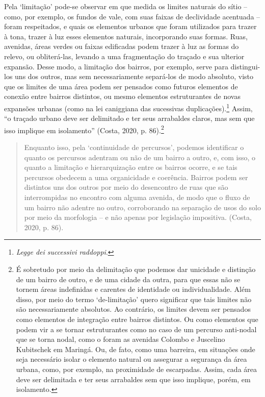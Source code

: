 \documentclass[12pt, a4paper]{book} %
\begin{document}
        Pela `limitação' pode-se observar em que medida os limites naturais do sítio – como, por exemplo, os fundos de vale, com suas faixas de declividade acentuada – foram respeitados, e quais os elementos urbanos que foram utilizados para trazer à tona, trazer à luz esses elementos naturais, incorporando suas formas. Ruas, avenidas, áreas verdes ou faixas edificadas podem trazer à luz as formas do relevo, ou obliterá-las, levando a uma fragmentação do traçado e sua ulterior expansão. Desse modo, a limitação dos bairros, por exemplo, serve para distingui-los uns dos outros, mas sem necessariamente separá-los de modo absoluto, visto que os limites de uma área podem ser pensados como futuros elementos de conexão entre bairros distintos, ou mesmo elementos estruturantes de novas expansões urbanas (como na lei caniggiana das sucessivas duplicações).\footnote[0]{\textit{Legge dei successivi raddoppi}.} Assim, ``o traçado urbano deve ser delimitado e ter seus arrabaldes claros, mas sem que isso implique em isolamento'' (Costa, 2020, p. 86).\footnote[26]{É sobretudo por meio da delimitação que podemos dar unicidade e distinção de um bairro de outro, e de uma cidade da outra, para que essas não se tornem áreas indefinidas e carentes de identidade ou individualidade. Além disso, por meio do termo ‘de-limitação’ quero significar que tais limites não são necessariamente absolutos. Ao contrário, os limites devem ser pensados como elementos de integração entre bairros distintos. Ou como elementos que podem vir a se tornar estruturantes como no caso de um percurso anti-nodal que se torna nodal, como o foram as avenidas Colombo e Juscelino Kubitschek em Maringá. Ou, de fato, como uma barreira, em situações onde seja necessário isolar o elemento natural ou assegurar a segurança da área urbana, como, por exemplo, na proximidade de escarpadas. Assim, cada área deve ser delimitada e ter seus arrabaldes sem que isso implique, porém, em isolamento.}

        \begin{quotation}
            Enquanto isso, pela ‘continuidade de percursos’, podemos identificar o quanto os percursos adentram ou não de um bairro a outro, e, com isso, o quanto a limitação e hierarquização entre os bairros ocorre, e se tais percursos obedecem a uma organicidade e coerência. Bairros podem ser distintos uns dos outros por meio do desencontro de ruas que são interrompidas no encontro com alguma avenida, de modo que o fluxo de um bairro não adentre no outro, corroborando na separação de usos do solo por meio da morfologia – e não apenas por legislação impositiva. (Costa, 2020, p. 86).
        \end{quotation}
\end{document}
